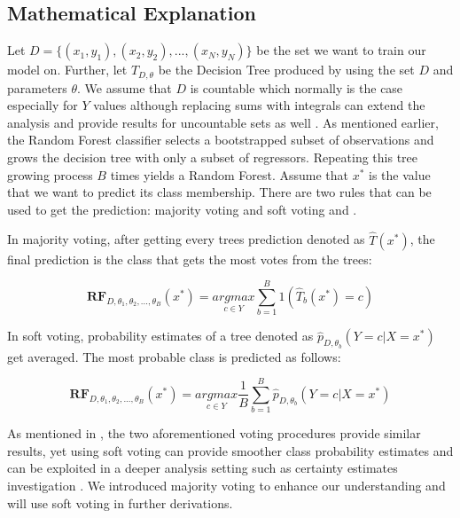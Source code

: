\subsection{Mathematical Explanation}
Let $D = \{(x_{1},y_{1}), (x_{2}, y_{2}), ... , (x_{N}, y_{N})\}$ be the set we want to train our model on. 
Further, let $T_{D, \theta}$ be the Decision Tree produced by using the set $D$ 
and parameters $\theta$. We assume that $D$ is countable which normally is the 
case especially for $Y$ values although replacing sums with integrals can extend the analysis and 
provide results for uncountable sets as well \cite{kohavi1996bias}. As mentioned earlier, 
the Random Forest classifier selects a bootstrapped subset of observations and 
grows the decision tree with only a subset of regressors. Repeating this tree growing process $B$ times 
yields a Random Forest. Assume that $x^*$ is the value that we want to predict its class membership.
There are two rules that can be used to get the prediction:
majority voting and  soft voting \cite{louppe2014understanding} and \cite{zhou2012ensemble}.

In majority voting, after getting every trees prediction denoted as $\hat{T}(x^*)$, 
the final prediction is the class that gets the most votes from the trees:

\begin{equation}
\boldsymbol{RF}_{D, \theta_{1}, \theta_{2}, ..., \theta_{B}} (x^*) =
	\underset{c \in Y}{argmax} \sum_{b = 1}^{B}{1(\hat{T}_{b}(x^*) = c)}
\end{equation}

In soft voting, probability estimates of a tree denoted as $\hat{p}_{D, \theta_{b}} (Y = c | X = x^*)$  get averaged.
The most probable class is predicted as follows:

\begin{equation}
\boldsymbol{RF}_{D, \theta_{1}, \theta_{2}, ..., \theta_{B}} (x^*) =
	\underset{c \in Y}{argmax} \dfrac{1}{B}\sum_{b = 1}^{B}{\hat{p}_{D, \theta_{b}} (Y = c | X = x^*)}
\end{equation}

As mentioned in \cite{breiman1996bagging}, the two aforementioned voting procedures provide similar results, 
yet using soft voting can provide smoother class probability estimates and can be exploited in a deeper analysis setting such as 
certainty estimates investigation \cite{louppe2014understanding}. 
We introduced majority voting to enhance our understanding and will use soft voting in further derivations. 


